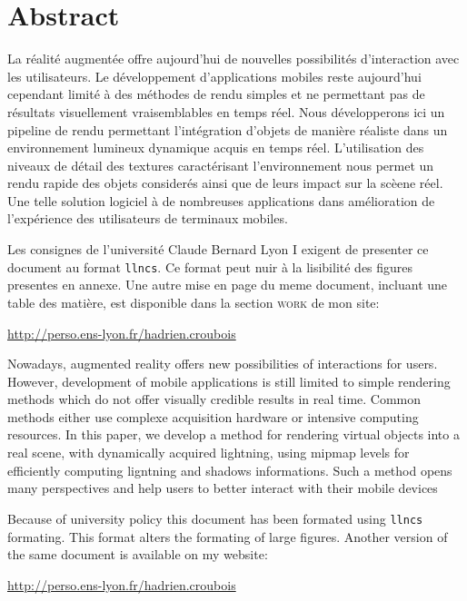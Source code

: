 \documentclass[10pt,a4paper,twoside, twocolumn]{report}
\begin{document}
\vfill

{}
\section*{Abstract}


  \vfill
  
	La réalité augmentée offre aujourd'hui de nouvelles possibilités d’interaction avec les utilisateurs. Le développement d'applications mobiles reste aujourd'hui cependant limité à des méthodes de rendu simples et ne permettant pas de résultats visuellement vraisemblables en temps réel. Nous développerons ici un pipeline de rendu permettant l’intégration d'objets de manière réaliste dans un environnement lumineux dynamique acquis en temps réel. L'utilisation des niveaux de détail des textures caractérisant l'environnement nous permet un rendu rapide des objets considerés ainsi que de leurs impact sur la scèene réel. Une telle solution logiciel à de nombreuses applications dans amélioration de l’expérience des utilisateurs de terminaux mobiles.

	\ifllncs
	Les consignes de l'université Claude Bernard Lyon I exigent de presenter ce document au format \texttt{llncs}. Ce format peut nuir à la lisibilité des figures presentes en annexe. Une autre mise en page du meme document, incluant une table des matière, est disponible dans la section \textsc{work} de mon site:

	\begin{center}\href{http://perso.ens-lyon.fr/hadrien.croubois}{http://perso.ens-lyon.fr/hadrien.croubois}\end{center}
	\fi

	\vspace{1cm}

	Nowadays, augmented reality offers new possibilities of interactions for users. However, development of mobile applications is still limited to simple rendering methods which do not offer visually credible  results in real time. Common methods either use complexe acquisition hardware or intensive computing resources. In this paper, we develop a method for rendering virtual objects into a real scene, with dynamically acquired lightning, using mipmap levels for efficiently computing ligntning and shadows informations. Such a method opens many perspectives and help users to better interact with their mobile devices

	\ifllncs
	Because of university policy this document has been formated using \texttt{llncs} formating. This format alters the formating of large figures. Another version of the same document is available on my website:

	\begin{center}\href{http://perso.ens-lyon.fr/hadrien.croubois}{http://perso.ens-lyon.fr/hadrien.croubois}\end{center}
	\fi

  \vfill
\end{document}
